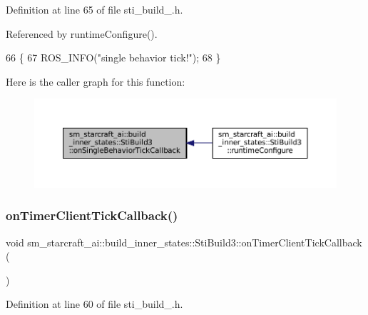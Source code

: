 Definition at line 65 of file sti\+\_\+build\+\_.\+h.



Referenced by runtime\+Configure().


\begin{DoxyCode}
66   \{
67     ROS\_INFO(\textcolor{stringliteral}{"single behavior tick!"});
68   \}
\end{DoxyCode}
Here is the caller graph for this function\+:
\nopagebreak
\begin{figure}[H]
\begin{center}
\leavevmode
\includegraphics[width=350pt]{structsm__starcraft__ai_1_1build__inner__states_1_1StiBuild3_aa6963d70ef661d71e07be8218e29916f_icgraph}
\end{center}
\end{figure}
\mbox{\label{structsm__starcraft__ai_1_1build__inner__states_1_1StiBuild3_a73f1ba58018abc5a9c2ef617795d9987}} 
\subsubsection{\texorpdfstring{on\+Timer\+Client\+Tick\+Callback()}{onTimerClientTickCallback()}}
{\footnotesize\ttfamily void sm\+\_\+starcraft\+\_\+ai\+::build\+\_\+inner\+\_\+states\+::\+Sti\+Build3\+::on\+Timer\+Client\+Tick\+Callback (\begin{DoxyParamCaption}{ }\end{DoxyParamCaption})\hspace{0.3cm}{\ttfamily [inline]}}



Definition at line 60 of file sti\+\_\+build\+\_.\+h.



